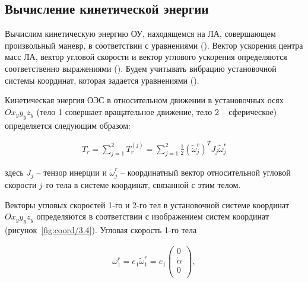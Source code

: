 \subsection{Вычисление кинетической энергии} \label{sec:ch3/sec6}

Вычислим кинетическую энергию ОУ, находящемся на ЛА, совершающем произвольный маневр, в соответствии с уравнениями (). Вектор ускорения центра масс ЛА, вектор угловой скорости и вектор углового ускорения определяются соответственно выражениями (). Будем учитывать вибрацию установочной системы координат, которая задается уравнениями ().

Кинетическая энергия ОЭС в относительном движении в установочных осях  \( Ox_{y}y_{y}z_{y} \)  (тело 1 совершает вращательное движение, тело 2 – сферическое) определяется следующим образом:\par

\begin{equation}
\label{eq:p3:8}
\begin{alignedat}{2}
T_{r}= 
\sum_{j=1}^{2}T_{r}^{ \left( j \right) }= 
\sum_{j=1}^{2}\frac{1}{2} \left(  \tilde{\omega}_{j}^{r} \right) ^{T}J_{j} \tilde{\omega}_{j}^{r}
\end{alignedat}
\end{equation}

здесь  
\( J_{j} \) – тензор инерции и  
\(  \tilde{\omega}_{j}^{r} \) – координатный вектор относительной угловой скорости \textit{j}–го тела в системе координат, связанной с этим телом.\par


Векторы угловых скоростей 1-го и 2-го тел в установочной системе координат  \( Ox_{y}y_{y}z_{y} \)  определяются в соответствии с изображением систем координат (рисунок~\ref{fig:coord/3.4}). Угловая скорость 1-го тела \par

\begin{equation}
\label{eq:p3:9}
\begin{alignedat}{2}
\bar{\omega}_{1}^{r}=e_{1} \tilde{\omega}_{1}^{r}=e_{1} \left( \begin{matrix}
0\\
\dot{\alpha} \\
0\\
\end{matrix}
\right) ,
\end{alignedat}
\end{equation}

